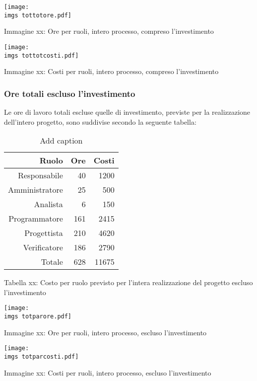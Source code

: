 \texttt{[image: \\imgs tottotore.pdf]}
\caption{Immagine xx: Ore per ruoli, intero processo, compreso l’investimento}

\texttt{[image: \\imgs tottotcosti.pdf]}
\caption{Immagine xx: Costi per ruoli, intero processo, compreso l’investimento}


\subsubsection{Ore totali escluso l’investimento}
Le ore di lavoro totali escluse quelle di investimento, previste per la realizzazione dell’intero progetto, sono suddivise secondo la seguente tabella:

\begin{table}[htbp]
  \centering
  \caption{Add caption}
    \begin{tabular}{rrr}
    \toprule
    Ruolo & Ore   & Costi \\
    \midrule
    Responsabile & 40    & 1200 \\
    Amministratore & 25    & 500 \\
    Analista & 6     & 150 \\
    Programmatore & 161   & 2415 \\
    Progettista & 210   & 4620 \\
    Verificatore & 186   & 2790 \\
    Totale & 628   & 11675 \\
    \bottomrule
    \end{tabular}%
  \label{tab:addlabel}%
\end{table}%
\caption{Tabella xx: Costo per ruolo previsto per l’intera realizzazione del progetto escluso l’investimento}

\texttt{[image: \\imgs totparore.pdf]}
\caption{Immagine xx: Ore per ruoli, intero processo, escluso l’investimento}

\texttt{[image: \\imgs totparcosti.pdf]}
\caption{Immagine xx: Costi per ruoli, intero processo, escluso l’investimento}